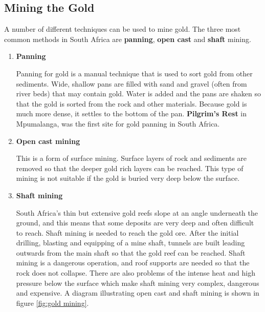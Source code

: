 \subsection{Mining the Gold}

A number of different techniques can be used to mine gold. The three most common methods in South Africa are \textbf{panning}, \textbf{open cast} and \textbf{shaft} mining.

\begin{enumerate}

\item{\textbf{Panning}

Panning for gold is a manual technique that is used to sort gold from other sediments. Wide, shallow pans are filled with sand and gravel (often from river beds) that may contain gold. Water is added and the pans are shaken so that the gold is sorted from the rock and other materials. Because gold is much more dense, it settles to the bottom of the pan. \textbf{Pilgrim's Rest} in Mpumalanga, was the first site for gold panning in South Africa.
}

\item{\textbf{Open cast mining}

This is a form of surface mining. Surface layers of rock and sediments are removed so that the deeper gold rich layers can be reached. This type of mining is not suitable if the gold is buried very deep below the surface.
}

\item{\textbf{Shaft mining}

South Africa's thin but extensive gold reefs slope at an angle underneath the ground, and this means that some deposits are very deep and often difficult to reach.  Shaft mining is needed to reach the gold ore. After the initial drilling, blasting and equipping of a mine shaft, tunnels are built leading outwards from the main shaft so that the gold reef can be reached. Shaft mining is a dangerous operation, and roof supports are needed so that the rock does not collapse. There are also problems of the intense heat and high pressure below the surface which make shaft mining very complex, dangerous and expensive. A diagram illustrating open cast and shaft mining is shown in figure \ref{fig:gold mining}.
}


\end{enumerate}
